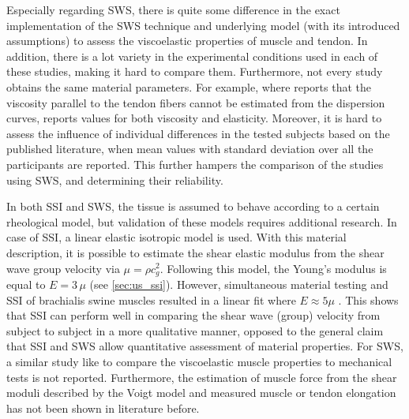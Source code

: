 Especially regarding SWS, there is quite some difference in the exact implementation of the SWS technique and underlying model (with its introduced assumptions) to assess the viscoelastic properties of muscle and tendon. In addition, there is a lot variety in the experimental conditions used in each of these studies, making it hard to compare them. Furthermore, not every study obtains the same material parameters. For example, where \cite{brum_vivo_2014, helfenstein-didier_vivo_2016} reports that the viscosity parallel to the tendon fibers cannot be estimated from the dispersion curves, \cite{cortes_continuous_2015} reports values for both viscosity and elasticity. Moreover, it is hard to assess the influence of individual differences in the tested subjects based on the published literature, when mean values with standard deviation over all the participants are reported. This further hampers the comparison of the studies using SWS, and determining their reliability.

In both SSI and SWS, the tissue is assumed to behave according to a certain rheological model, but validation of these models requires additional research. In case of SSI, a linear elastic isotropic model is used. With this material description, it is possible to estimate the shear elastic modulus from the shear wave group velocity via $\mu=\rho c_g^2$. Following this model, the Young's modulus is equal to $E = 3\, \mu$ (see \autoref{sec:us_ssi}). However, simultaneous material testing and SSI of brachialis swine muscles resulted in a linear fit where $E \approx 5\mu$ \cite{eby_validation_2013}. This shows that SSI can perform well in comparing the shear wave (group) velocity from subject to subject in a more qualitative manner, opposed to the general claim that SSI and SWS allow quantitative assessment of material properties. For SWS, a similar study like \cite{eby_validation_2013} to compare the viscoelastic muscle properties to mechanical tests is not reported. Furthermore, the estimation of muscle force from the shear moduli described by the Voigt model and measured muscle or tendon elongation has not been shown in literature before.


